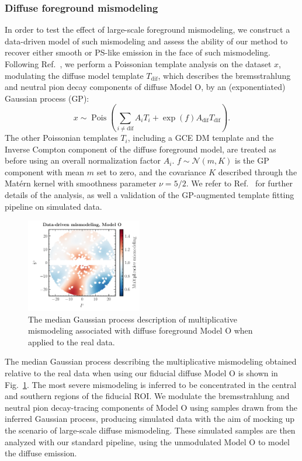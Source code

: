 \documentclass[prd,aps,10pt,nofootinbib,twocolumn,superscriptaddress,preprintnumbers,balancelastpage,longbibliography]{revtex4-1}
\begin{document}
\subsubsection*{Diffuse foreground mismodeling}

In order to test the effect of large-scale foreground mismodeling, we construct a data-driven model of such mismodeling and assess the ability of our method to recover either smooth or PS-like emission in the face of such mismodeling.  Following Ref.~\cite{Mishra-Sharma:2020kjb}, we perform a Poissonian template analysis on the \Fermi dataset $x$, modulating the diffuse model template $T_{\mathrm{dif}}$, which describes the bremsstrahlung and neutral pion decay components of diffuse Model O, by an (exponentiated) Gaussian process (GP):
\begin{equation}
    x \sim \operatorname{Pois}\left(\sum_{i \neq \mathrm{dif}} A_{i} T_{i}+\exp \left(f\right) A_{\mathrm{dif}} T_{\mathrm{dif}}\right).
\end{equation}
The other Poissonian templates $T_{i}$, including a GCE DM template and the Inverse Compton component of the diffuse foreground model, are treated as before using an overall normalization factor $A_{i}$. $f \sim \mathcal{N}(m, K)$ is the GP component with mean $m$ set to zero, and the covariance $K$ described through the Mat\'ern kernel with smoothness parameter $\nu = 5/2$. We refer to Ref.~\cite{Mishra-Sharma:2020kjb} for further details of the analysis, as well a validation of the GP-augmented template fitting pipeline on simulated data.

%
\begin{figure}
    \centering
    \includegraphics[width=0.45\textwidth]{plots/dd_mismo_map.pdf}
    \caption{The median Gaussian process description of multiplicative mismodeling associated with diffuse foreground Model O when applied to the real \Fermi data.}
    \label{fig:dd_mismo_map}
\end{figure}
%

The median Gaussian process describing the multiplicative mismodeling obtained relative to the real \Fermi data when using our fiducial diffuse Model O is shown in Fig.~\ref{fig:dd_mismo_map}. The most severe mismodeling is inferred to be concentrated in the central and southern regions of the fiducial ROI. We modulate the bremsstrahlung and neutral pion decay-tracing components of Model O using samples drawn from the inferred Gaussian process, producing simulated data with the aim of mocking up the scenario of large-scale diffuse mismodeling. These simulated samples are then analyzed with our standard pipeline, using the unmodulated Model O to model the diffuse emission.
\end{document}
